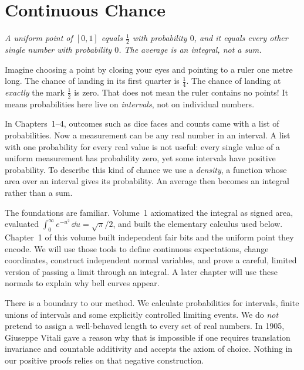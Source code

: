 \chapter{Continuous Chance}

\begin{center}\itshape
A uniform point of $[0,1]$ equals $\frac12$ with probability $0$, and it equals every other\\
single number with probability $0$. The average is an integral, not a sum.
\end{center}

Imagine choosing a point by closing your eyes and pointing to a ruler one metre long. The chance of landing in its first quarter is $\tfrac14$. The chance of landing at \emph{exactly} the mark $\tfrac12$ is zero. That does not mean the ruler contains no points! It means probabilities here live on \emph{intervals}, not on individual numbers.

In Chapters~1--4, outcomes such as dice faces and counts came with a list of probabilities. Now a measurement can be any real number in an interval. A list with one probability for every real value is not useful: every single value of a uniform measurement has probability zero, yet some intervals have positive probability. To describe this kind of chance we use a \emph{density}, a function whose area over an interval gives its probability. An average then becomes an integral rather than a sum.

The foundations are familiar. Volume~1 axiomatized the integral as signed area, evaluated $\int_0^{\infty}e^{-u^2}\,\dd u=\sqrt{\pi}/2$, and built the elementary calculus used below. Chapter~1 of this volume built independent fair bits and the uniform point they encode. We will use those tools to define continuous expectations, change coordinates, construct independent normal variables, and prove a careful, limited version of passing a limit through an integral. A later chapter will use these normals to explain why bell curves appear.

There is a boundary to our method. We calculate probabilities for intervals, finite unions of intervals and some explicitly controlled limiting events. We do \emph{not} pretend to assign a well-behaved length to every set of real numbers. In 1905, Giuseppe Vitali gave a reason why that is impossible if one requires translation invariance and countable additivity and accepts the axiom of choice. Nothing in our positive proofs relies on that negative construction.

